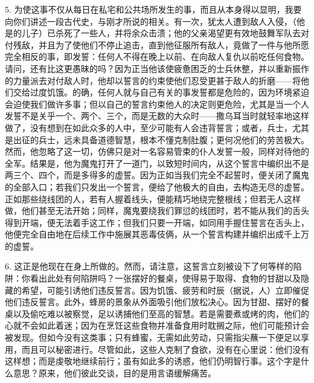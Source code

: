 5. 为使这事不仅从每日在私宅和公共场所发生的事，而且从本身得以显明，我要向你们讲述一段古代史，与刚才所说的相关。有一次，犹太人遭到敌人入侵，（他是的儿子）已杀死了一些人，并将余众击溃；他的父亲渴望更有效地鼓舞军队去对付残敌，并且为了使他们不停止追击，直到他征服所有敌人，竟做了一件与他所愿完全相反的事，即发誓：任何人不得在晚上以前、在向敌人复仇以前吃任何食物。请问，还有比这更愚昧的吗？因为正当他该使疲惫困乏的士兵休整，并以重新振作的力量派去对付敌人时，他却以誓言的约束使他们忍受更甚于敌人的折磨——将他们交给过度饥饿。的确，任何人就与自己有关的事发誓都是危险的，因为环境紧迫会迫使我们做许多事；但以自己的誓言约束他人的决定则更危险，尤其是当一个人发誓不是关乎一个、两个、三个，而是无数的大众时——撒乌耳当时就轻率地这样做了，没有想到在如此众多的人中，至少可能有人会违背誓言；或者，兵士，尤其是出征的兵士，远未具备道德智慧，根本不懂克制肚腹；更何况他们的劳苦极大。然而，他忽略了这一切，仿佛只是对一名容易管束的仆人发誓一般，同样对待他的全军。结果是，他为魔鬼打开了一道门，以致短时间内，从这个誓言中编织出不是两三个、四个，而是多得多的虚誓。因为正如当我们完全不起誓时，便关闭了魔鬼的全部入口；若我们只发出一个誓言，便给了他极大的自由，去构造无尽的虚誓。正如那些绕线团的人，若有人握着线头，便能精巧地绕完整根线；但若无人这样做，他们甚至无法开始；同样，魔鬼要绕我们罪愆的线团时，若不能从我们的舌头得到开端，便无法着手这工作；但我们只要一开端，如同用手握住誓言在舌头上，他便完全自由地在后续工作中施展其恶毒伎俩，从一个誓言构建并编织出成千上万的虚誓。\par

6. 这正是他现在在身上所做的。然而，请注意，这誓言立刻被设下了何等样的陷阱：你看出此处有何陷阱吗？一张摆好的餐桌，使得易于取得、食物的甘甜以及隐藏的希望，可能引诱他们违反誓言。因为饥饿、疲劳和时辰（据说，人）立即催促他们违反誓言。此外，蜂房的景象从外面吸引他们放松决心。因为甘甜、摆好的餐桌以及偷吃难以被察觉，足以诱捕他们至高的智慧。若是需要煮或烤的肉，他们的心就不会如此着迷；因为在烹饪这些食物并准备食用时耽搁之际，他们可能预计会被发现。但如今没有这类事；只有蜂蜜，无需如此劳动，只需指尖蘸一下便足以享用，而且可以秘密进行。尽管如此，这些人克制了食欲，没有在心里说：他们没有这样想；而是虔敬地继续前行；虽有如此多的诱惑，他们仍明智行事。这个字是什么意思？原来，他们彼此交谈，目的是用言语缓解痛苦。\par

